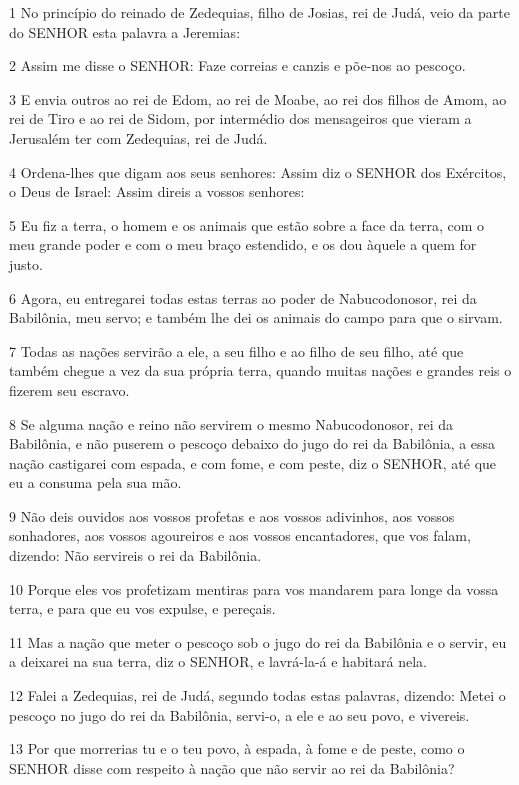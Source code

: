\par 1 No princípio do reinado de Zedequias, filho de Josias, rei de Judá, veio da parte do SENHOR esta palavra a Jeremias:
\par 2 Assim me disse o SENHOR: Faze correias e canzis e põe-nos ao pescoço.
\par 3 E envia outros ao rei de Edom, ao rei de Moabe, ao rei dos filhos de Amom, ao rei de Tiro e ao rei de Sidom, por intermédio dos mensageiros que vieram a Jerusalém ter com Zedequias, rei de Judá.
\par 4 Ordena-lhes que digam aos seus senhores: Assim diz o SENHOR dos Exércitos, o Deus de Israel: Assim direis a vossos senhores:
\par 5 Eu fiz a terra, o homem e os animais que estão sobre a face da terra, com o meu grande poder e com o meu braço estendido, e os dou àquele a quem for justo.
\par 6 Agora, eu entregarei todas estas terras ao poder de Nabucodonosor, rei da Babilônia, meu servo; e também lhe dei os animais do campo para que o sirvam.
\par 7 Todas as nações servirão a ele, a seu filho e ao filho de seu filho, até que também chegue a vez da sua própria terra, quando muitas nações e grandes reis o fizerem seu escravo.
\par 8 Se alguma nação e reino não servirem o mesmo Nabucodonosor, rei da Babilônia, e não puserem o pescoço debaixo do jugo do rei da Babilônia, a essa nação castigarei com espada, e com fome, e com peste, diz o SENHOR, até que eu a consuma pela sua mão.
\par 9 Não deis ouvidos aos vossos profetas e aos vossos adivinhos, aos vossos sonhadores, aos vossos agoureiros e aos vossos encantadores, que vos falam, dizendo: Não servireis o rei da Babilônia.
\par 10 Porque eles vos profetizam mentiras para vos mandarem para longe da vossa terra, e para que eu vos expulse, e pereçais.
\par 11 Mas a nação que meter o pescoço sob o jugo do rei da Babilônia e o servir, eu a deixarei na sua terra, diz o SENHOR, e lavrá-la-á e habitará nela.
\par 12 Falei a Zedequias, rei de Judá, segundo todas estas palavras, dizendo: Metei o pescoço no jugo do rei da Babilônia, servi-o, a ele e ao seu povo, e vivereis.
\par 13 Por que morrerias tu e o teu povo, à espada, à fome e de peste, como o SENHOR disse com respeito à nação que não servir ao rei da Babilônia?
